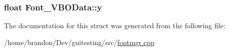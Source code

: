 \hypertarget{struct_font___v_b_o_data_8994d6d37aea91d225b0466aaed458c8}{
\subsubsection[{y}]{\setlength{\rightskip}{0pt plus 5cm}float {\bf Font\_\-VBOData::y}}}
\label{struct_font___v_b_o_data_8994d6d37aea91d225b0466aaed458c8}




The documentation for this struct was generated from the following file:\begin{CompactItemize}
\item 
/home/brandon/Dev/guitesting/src/\hyperlink{fontmgr_8cpp}{fontmgr.cpp}\end{CompactItemize}
